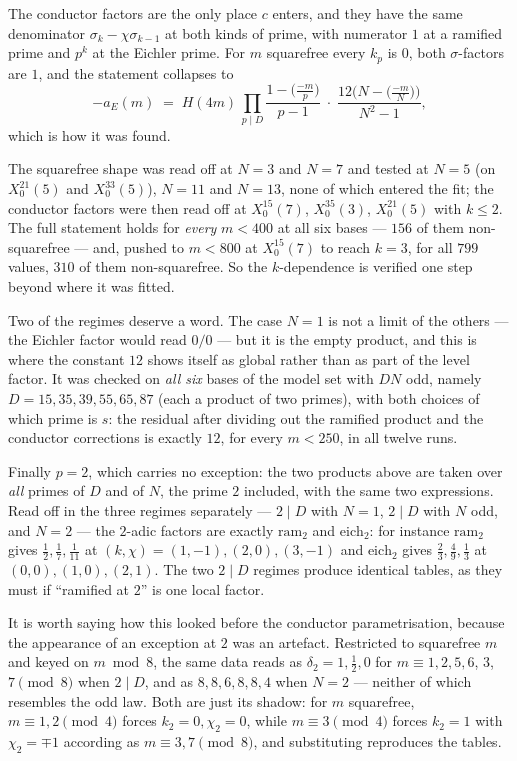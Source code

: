 \documentclass[11pt,reqno]{amsart}
\theoremstyle{plain}
\theoremstyle{definition}
\begin{document}
The conductor factors are the only place $c$ enters, and they have the same denominator
$\sigma_{k}-\chi\sigma_{k-1}$ at both kinds of prime, with numerator $1$ at a ramified
prime and $p^{k}$ at the Eichler prime. For $m$ squarefree every $k_p$ is $0$, both
$\sigma$-factors are $1$, and the statement collapses to
\[
  -a_E(m)\;=\;H(4m)\,\prod_{p\mid D}\frac{1-\bigl(\tfrac{-m}{p}\bigr)}{p-1}
    \;\cdot\;\frac{12\bigl(N-\bigl(\tfrac{-m}{N}\bigr)\bigr)}{N^2-1},
\]
which is how it was found.

The squarefree shape was read off at $N=3$ and $N=7$ and tested at $N=5$ (on $X_0^{21}(5)$
and $X_0^{33}(5)$), $N=11$ and $N=13$, none of which entered the fit; the conductor factors
were then read off at $X_0^{15}(7)$, $X_0^{35}(3)$, $X_0^{21}(5)$ with $k\le2$. The full
statement holds for \emph{every} $m<400$ at all six bases --- $156$ of them non-squarefree
--- and, pushed to $m<800$ at $X_0^{15}(7)$ to reach $k=3$, for all $799$ values, $310$ of
them non-squarefree. So the $k$-dependence is verified one step beyond where it was fitted.

Two of the regimes deserve a word. The case $N=1$ is not a limit of the others --- the Eichler factor would read $0/0$ --- but
it is the empty product, and this is where the constant $12$ shows itself as global rather
than as part of the level factor. It was checked on \emph{all six} bases of the model set
with $DN$ odd, namely $D=15,35,39,55,65,87$ (each a product of two primes), with both
choices of which prime is $s$: the residual after dividing out the ramified product and the
conductor corrections is exactly $12$, for every $m<250$, in all twelve runs.

Finally $p=2$, which carries no exception: the two products above are taken over
\emph{all} primes of $D$ and of $N$, the prime $2$ included, with the same two expressions.
Read off in the three regimes separately --- $2\mid D$ with $N=1$, $2\mid D$ with $N$ odd,
and $N=2$ --- the $2$-adic factors are exactly $\mathrm{ram}_2$ and $\mathrm{eich}_2$: for
instance $\mathrm{ram}_2$ gives $\tfrac12,\tfrac17,\tfrac1{11}$ at
$(k,\chi)=(1,-1),(2,0),(3,-1)$ and $\mathrm{eich}_2$ gives $\tfrac23,\tfrac49,\tfrac13$ at
$(0,0),(1,0),(2,1)$. The two $2\mid D$ regimes produce identical tables, as they must if
``ramified at $2$'' is one local factor.

It is worth saying how this looked before the conductor parametrisation, because the
appearance of an exception at $2$ was an artefact. Restricted to squarefree $m$ and keyed
on $m\bmod 8$, the same data reads as $\delta_2=1,\tfrac12,0$ for $m\equiv1,2,5,6$, $3$,
$7\pmod 8$ when $2\mid D$, and as $8,8,6,8,8,4$ when $N=2$ --- neither of which resembles
the odd law. Both are just its shadow: for $m$ squarefree, $m\equiv1,2\pmod4$ forces
$k_2=0,\chi_2=0$, while $m\equiv3\pmod4$ forces $k_2=1$ with $\chi_2=\mp1$ according as
$m\equiv3,7\pmod 8$, and substituting reproduces the tables.
\end{document}
